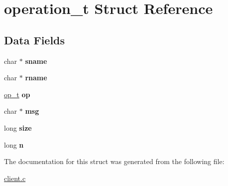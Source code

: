 \hypertarget{structoperation__t}{}\section{operation\+\_\+t Struct Reference}
\label{structoperation__t}
\subsection*{Data Fields}
\begin{DoxyCompactItemize}
\item 
\mbox{\label{structoperation__t_a596940e8f95dfc43bb298b5e8148c770}} 
char $\ast$ {\bfseries sname}
\item 
\mbox{\label{structoperation__t_a4abc08d8bf8e71d81f1928b77675d9a8}} 
char $\ast$ {\bfseries rname}
\item 
\mbox{\label{structoperation__t_a26b2efa792334cce1cd82d1c63754539}} 
\hyperlink{ops_8h_ac6fa1b34da8872e34c2936391332f44c}{op\+\_\+t} {\bfseries op}
\item 
\mbox{\label{structoperation__t_a32d2f5216cddb59c7cc8fb2806a7e727}} 
char $\ast$ {\bfseries msg}
\item 
\mbox{\label{structoperation__t_a37363161b41c4165b98cba7abc7a9d95}} 
long {\bfseries size}
\item 
\mbox{\label{structoperation__t_a0a627514f9cfe29006d6bcd8e4ba2b2e}} 
long {\bfseries n}
\end{DoxyCompactItemize}


The documentation for this struct was generated from the following file\+:\begin{DoxyCompactItemize}
\item 
\hyperlink{client_8c}{client.\+c}\end{DoxyCompactItemize}
